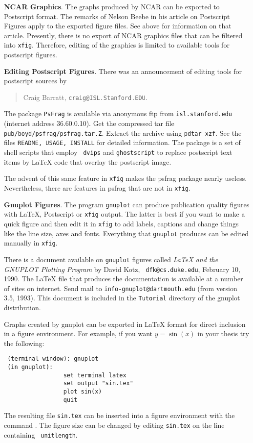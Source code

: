 {\bf NCAR Graphics}. The graphs produced by NCAR can be exported to
Postscript format. The remarks of Nelson Beebe in his article on
Postscript Figures apply to the exported figure files. See above for
information on that article. Presently, there is no export of NCAR
graphics files that can be filtered into {\tt xfig}. Therefore, editing
of the graphics is limited to available tools for postscript figures.

{\bf Editing Postscript Figures}.
There was an announcement of editing tools for postscript sources by
\begin{quote}
 Craig Barratt, \verb"craig@ISL.Stanford.EDU".
\end{quote}
The package
{\tt PsFrag} is available via anonymous ftp from {\tt isl.stanford.edu}
(internet address 36.60.0.10).  Get the compressed tar file
{\tt  pub/boyd/psfrag/psfrag.tar.Z}.
Extract the archive using {\tt pdtar xzf}.
See the files {\small\tt README, USAGE, INSTALL} for detailed
information. The package is a set of shell scripts that employ {\tt
dvips} and {\tt ghostscript} to replace postscript text items by
\LaTeX{} code that overlay the postscript image.

The advent of this same feature in {\tt xfig} makes the psfrag package
nearly useless. Nevertheless, there are features in psfrag that are
not in {\tt xfig}.


{\bf Gnuplot Figures}. The program {\tt gnuplot} can produce publication
quality figures with \LaTeX{}, Postscript or {\tt xfig} output. The
latter is best if you want to make a quick figure and then edit it in
{\tt xfig} to add labels, captions and change things like the line size,
axes and fonts. Everything that {\tt gnuplot} produces can be edited
manually in {\tt xfig}.

There is a document available on {\tt gnuplot} figures called {\em
\LaTeX{} and the GNUPLOT Plotting Program} by David Kotz, {\tt
dfk@cs.duke.edu}, February 10, 1990. The \LaTeX{} file that produces the
documentation is available at a number of sites on internet. Send mail
to {\tt info-gnuplot@dartmouth.edu} (from version 3.5, 1993). This
document is included in the {\tt Tutorial} directory of the gnuplot
distribution.

Graphs created by gnuplot can be exported in \LaTeX{} format for direct
inclusion in a figure environment.
For example, if you want $y=\sin(x)$ in your thesis try the following:
\begin{verbatim}
 (terminal window): gnuplot
 (in gnuplot):
                 set terminal latex
                 set output "sin.tex"
                 plot sin(x)
                 quit
\end{verbatim}
The resulting file {\tt sin.tex} can be inserted into a figure
environment with the command \verb"". The figure size can
be changed by editing {\tt sin.tex} on the line containing {\tt
unitlength}.


